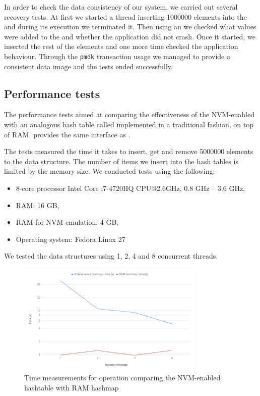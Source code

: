     In order to check the data consistency of our system, we carried out several recovery tests. 
    At first we started a thread inserting 1000000 elements into the \PHT and during its execution we terminated it. 
    Then using an \Iterator we checked what values were added to the \PHT and whether the application did not crash.
    Once it started, we inserted the rest of the elements and one more time checked the application behaviour. 
    Through the \texttt{pmdk} transaction usage we managed to provide a consistent data image and the tests ended successfully.
    
\subsection{Performance tests}

    The performance tests aimed at comparing the effectiveness of the NVM-enabled \PHT with an analogous hash table called \StandardHashMap implemented in a traditional fashion, on top of RAM. 
    \StandardHashMap provides the same interface as \NvmHashMap.
    
    The tests measured the time it takes to insert, get and remove 5000000 elements to the data structure. The number of items we insert into the hash tables is limited by the memory size. We conducted tests using the following:
    \begin{itemize}
        \item 8-core processor Intel Core i7-4720HQ CPU@2.6GHz, 0.8 GHz -- 3.6 GHz,
        \item RAM: 16 GB,
        \item RAM for NVM emulation: 4 GB,
        \item Operating system: Fedora Linux 27
    \end{itemize}
    We tested the data structures using 1, 2, 4 and 8 concurrent threads. 
    
    \begin{figure}[ht]
        \centering
        \includegraphics[width=0.8\textwidth]{thesis/figures/insert.png}
        \caption{Time measurements for \insertMethod operation comparing the NVM-enabled hashtable with RAM hashmap}
        \label{insertPlot}
    \end{figure}
    
